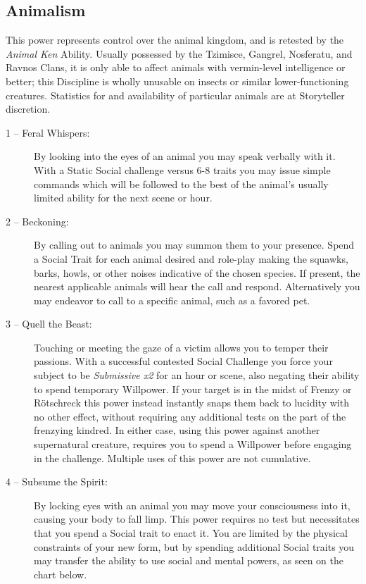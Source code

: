 \subsection{Animalism}
This power represents control over the animal kingdom, and is retested by the 
\emph{Animal Ken} Ability.  Usually possessed by the Tzimisce, Gangrel, Nosferatu, 
and Ravnos Clans, it is only able to affect animals with vermin-level intelligence or 
better; this Discipline is wholly unusable on insects or similar lower-functioning 
creatures.  Statistics for and availability of particular animals are at Storyteller 
discretion.

\begin{description}
	\item[1 -- Feral Whispers:]  By looking into the eyes of an animal 
	you may speak verbally with it.  With a Static Social challenge versus 6-8 traits 
	you may issue simple commands which will be followed to the best of the 
	animal's usually limited ability for the next scene or hour.
	\item[2 -- Beckoning:]  By calling out to animals you may summon them to 
	your presence.  Spend a Social Trait for each animal desired and role-play 
	making the squawks, barks, howls, or other noises indicative of the chosen 
	species.  If present, the nearest applicable animals will hear the call and 
	respond. Alternatively you may endeavor to call to a specific animal, such as a favored pet.
	\item[3 -- Quell the Beast:]  Touching or meeting the gaze of a victim 
	allows you to temper their passions.  With a successful contested Social 
	Challenge you force your subject to be \emph{Submissive x2} for an 
	hour or scene, also negating their ability to spend temporary 
	Willpower.  If your target is in the midst of Frenzy or R\"{o}tschreck this 
	power instead instantly snaps them back to lucidity with no other effect, without 
	requiring any additional tests on the part of the frenzying kindred.  In 
	either case, using this power against another supernatural creature, 
	requires you to spend a Willpower before engaging in the challenge. 
	Multiple uses of this power are not cumulative.
	\item[4 -- Subsume the Spirit:]  By locking eyes with an animal 
	you may move your consciousness into it, causing your body to fall 
	limp.  This power requires no test but necessitates that you spend a Social 
	trait to enact it.  You are limited by the physical constraints of your new 
	form, but by spending additional Social traits you may transfer the ability to 
	use social and mental powers, as seen on the chart below.  
	

\end{description}
